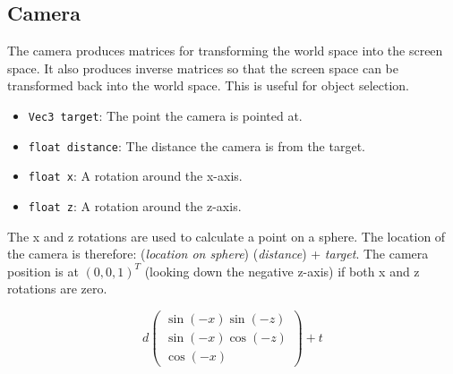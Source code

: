 \documentclass[10pt]{article}
\newcommand\m[1]{\begin{pmatrix}#1\end{pmatrix}}
\begin{document}
\subsection{Camera}
The camera produces matrices for transforming the world space into the screen space. It also produces inverse matrices so that the screen space can be transformed back into the world space. This is useful for object selection.
\begin{itemize}
\item \texttt{Vec3 target}: The point the camera is pointed at.
\item \texttt{float distance}: The distance the camera is from the target.
\item \texttt{float x}: A rotation around the x-axis.
\item \texttt{float z}: A rotation around the z-axis.
\end{itemize}
The x and z rotations are used to calculate a point on a sphere. The location of the camera is therefore: (\textit{location on sphere}) (\textit{distance}) + \textit{target}. The camera position is at $ (0, 0, 1)^T $ (looking down the negative z-axis) if both x and z rotations are zero.

\[ d\m{\sin(-x)\sin(-z) \\ \sin(-x)\cos(-z) \\ \cos(-x)} + t \]
\end{document}
